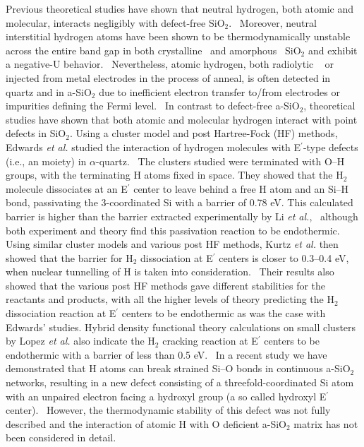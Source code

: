\documentclass[aps,prb,reprint,superscriptaddress,showpacs]{revtex4-1}
\begin{document}
Previous theoretical studies have shown that neutral hydrogen, both atomic and molecular, interacts negligibly with defect-free SiO$_2$.~\cite{blochl_vacancies,yokozawa_h} Moreover, neutral interstitial hydrogen atoms have been shown to be thermodynamically unstable across the entire band gap in both crystalline~\cite{blochl_vacancies} and amorphous~\cite{godet_hydrogen} SiO$_2$ and exhibit a negative-U behavior.~\cite{godet_hydrogen,robertson_oxides} Nevertheless, atomic hydrogen, both radiolytic ~\cite{griscom_hydrogen} or injected from metal electrodes in the process of anneal, is often detected in quartz and in a-SiO$_2$ due to inefficient electron transfer to/from electrodes or impurities defining the Fermi level.~\cite{griscom_hydrogen} In contrast to defect-free a-SiO$_2$, theoretical studies have shown that both atomic and molecular hydrogen interact with point defects in SiO$_2$. Using a cluster model and post Hartree-Fock (HF) methods, Edwards \emph{et al.} studied the interaction of hydrogen molecules with E$^\prime$-type defects (i.e., an \setatomsep{2em}\hspace{2 pt} moiety) in $\alpha$-quartz.~\cite{edwards_h2} The clusters studied were terminated with O--H groups, with the terminating H atoms fixed in space. They showed that the H$_2$ molecule dissociates at an E$^\prime$ center to leave behind a free H atom and an Si--H bond, passivating the 3-coordinated Si with a barrier of 0.78 eV. This calculated barrier is higher than the barrier extracted experimentally by Li \emph {et al.},~\cite{h2crack_li} although both experiment and theory find this passivation reaction to be endothermic. Using similar cluster models and various post HF methods, Kurtz \emph{et al.} then showed that the barrier for H$_2$ dissociation at E$^\prime$ centers is closer to 0.3--0.4 eV, when nuclear tunnelling of H is taken into consideration.~\cite{kurtz_h2} Their results also showed that the various post HF methods gave different stabilities for the reactants and products, with all the higher levels of theory predicting the H$_2$ dissociation reaction at E$^\prime$ centers to be endothermic as was the case with Edwards' studies. Hybrid density functional theory calculations on small clusters by Lopez \emph{et al.} also indicate the H$_2$ cracking reaction at E$^\prime$ centers to be endothermic with a barrier of less than 0.5 eV.~\cite{h2crack_sidb_ts} In a recent study we have demonstrated that H atoms can break strained \mbox{Si--O} bonds in continuous a-SiO$_2$ networks, resulting in a new defect consisting of a threefold-coordinated Si atom with an unpaired electron facing a hydroxyl group (a so called hydroxyl E$^\prime$ center).~\cite{aelsayed_prl} However, the thermodynamic stability of this defect was not fully described and the interaction of atomic H with O deficient a-SiO$_2$ matrix has not been considered in detail.
\end{document}
